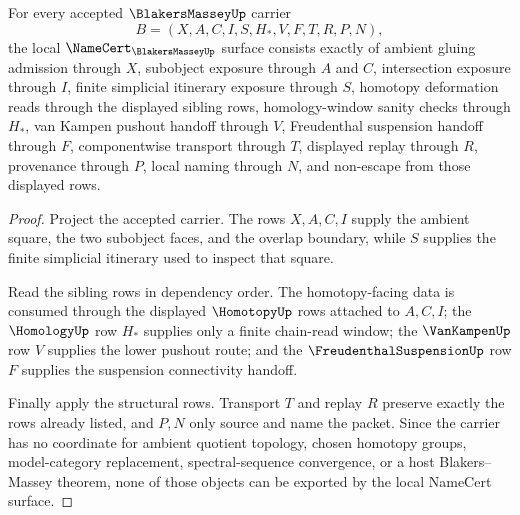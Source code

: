 \begin{theorem}
\label{thm:blakers-massey-namecert-obligations}
For every accepted $\BlakersMasseyUp$ carrier
$$
B=(X,A,C,I,S,H_*,V,F,T,R,P,N),
$$
the local $\NameCert_{\BlakersMasseyUp}$ surface consists exactly of ambient gluing admission through $X$, subobject exposure through $A$ and $C$, intersection exposure through $I$, finite simplicial itinerary exposure through $S$, homotopy deformation reads through the displayed sibling rows, homology-window sanity checks through $H_*$, van Kampen pushout handoff through $V$, Freudenthal suspension handoff through $F$, componentwise transport through $T$, displayed replay through $R$, provenance through $P$, local naming through $N$, and non-escape from those displayed rows.
\end{theorem}
\begin{proof}
Project the accepted carrier. The rows $X,A,C,I$ supply the ambient square, the two subobject faces, and the overlap boundary, while $S$ supplies the finite simplicial itinerary used to inspect that square.

Read the sibling rows in dependency order. The homotopy-facing data is consumed through the displayed $\HomotopyUp$ rows attached to $A,C,I$; the $\HomologyUp$ row $H_*$ supplies only a finite chain-read window; the $\VanKampenUp$ row $V$ supplies the lower pushout route; and the $\FreudenthalSuspensionUp$ row $F$ supplies the suspension connectivity handoff.

Finally apply the structural rows. Transport $T$ and replay $R$ preserve exactly the rows already listed, and $P,N$ only source and name the packet. Since the carrier has no coordinate for ambient quotient topology, chosen homotopy groups, model-category replacement, spectral-sequence convergence, or a host Blakers--Massey theorem, none of those objects can be exported by the local NameCert surface.
\end{proof}


